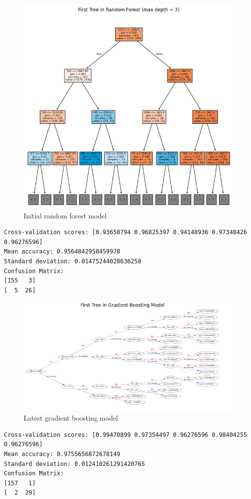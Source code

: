 \documentclass[conference]{IEEEtran}
\begin{document}
\begin{figure}[H]
    \centerline{\includegraphics[width=0.6\linewidth]{figs/random_forest.png}}
    \caption{Initial random forest model}
\end{figure}

\begin{lstlisting}[caption={Initial random forest model performance}]
Cross-validation scores: [0.93650794 0.96825397 0.94148936 0.97340426 0.96276596]
Mean accuracy: 0.9564842958459978
Standard deviation: 0.01475244028636258
Confusion Matrix:
[155   3]
[  5  26]
\end{lstlisting}

\begin{figure}[H]
    \centerline{\includegraphics[width=\linewidth]{figs/gradient_boosting.png}}
    \caption{Latest gradient boosting model}
\end{figure}

\begin{lstlisting}[caption={Gradient boosting model performance}]
Cross-validation scores: [0.99470899 0.97354497 0.96276596 0.98404255 0.96276596]
Mean accuracy: 0.9755656872678149
Standard deviation: 0.012410261291420765
Confusion Matrix:
[157   1]
[  2  29]
\end{lstlisting}
\end{document}
